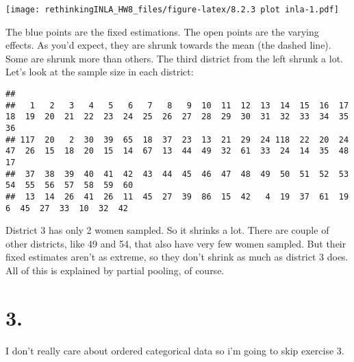 \documentclass[
]{article}
\newenvironment{Shaded}{\begin{snugshade}}{\end{snugshade}}
\newcommand{\KeywordTok}[1]{\textcolor[rgb]{0.13,0.29,0.53}{\textbf{#1}}}
\newcommand{\NormalTok}[1]{#1}
\newcommand{\OperatorTok}[1]{\textcolor[rgb]{0.81,0.36,0.00}{\textbf{#1}}}
\begin{document}
\texttt{[image: rethinkingINLA\_HW8\_files/figure-latex/8.2.3 plot inla-1.pdf]}

The blue points are the fixed estimations. The open points are the
varying effects. As you'd expect, they are shrunk towards the mean (the
dashed line). Some are shrunk more than others. The third district from
the left shrunk a lot. Let's look at the sample size in each district:

\begin{Shaded}
\end{Shaded}

\begin{verbatim}
## 
##   1   2   3   4   5   6   7   8   9  10  11  12  13  14  15  16  17  18  19  20  21  22  23  24  25  26  27  28  29  30  31  32  33  34  35  36 
## 117  20   2  30  39  65  18  37  23  13  21  29  24 118  22  20  24  47  26  15  18  20  15  14  67  13  44  49  32  61  33  24  14  35  48  17 
##  37  38  39  40  41  42  43  44  45  46  47  48  49  50  51  52  53  54  55  56  57  58  59  60 
##  13  14  26  41  26  11  45  27  39  86  15  42   4  19  37  61  19   6  45  27  33  10  32  42
\end{verbatim}

District 3 has only 2 women sampled. So it shrinks a lot. There are
couple of other districts, like 49 and 54, that also have very few women
sampled. But their fixed estimates aren't as extreme, so they don't
shrink as much as district 3 does. All of this is explained by partial
pooling, of course.

\hypertarget{section-2}{%
\section{3.}\label{section-2}}

I don't really care about ordered categorical data so i'm going to skip
exercise 3.
\end{document}

